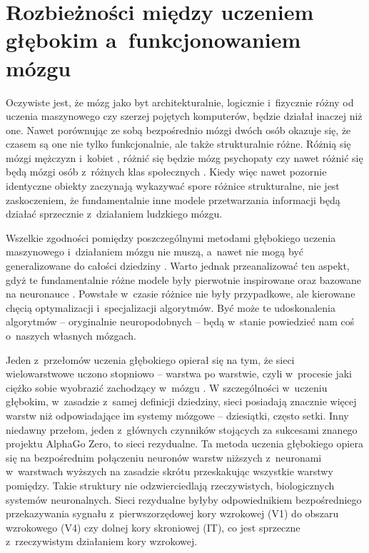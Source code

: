 \section{Rozbieżności między uczeniem głębokim a~funkcjonowaniem mózgu}
\label{sec:differences}

Oczywiste jest, że mózg jako byt architekturalnie, logicznie i~fizycznie różny od uczenia maszynowego czy szerzej pojętych komputerów, będzie działał inaczej niż one.
Nawet porównując ze sobą bezpośrednio mózgi dwóch osób okazuje się, że czasem są one nie tylko funkcjonalnie, ale także strukturalnie różne.
Różnią się mózgi mężczyzn i~kobiet \cite{ingalhalikar2014sex}, różnić się będzie mózg psychopaty \cite{fallon2017neuroanatomical} czy nawet różnić się będą mózgi osób z~różnych klas społecznych \cite{rushton1996brain}.
Kiedy więc nawet pozornie identyczne obiekty zaczynają wykazywać spore różnice strukturalne, nie jest zaskoczeniem, że fundamentalnie inne modele przetwarzania informacji będą działać sprzecznie z~działaniem ludzkiego mózgu.

Wszelkie zgodności pomiędzy poszczególnymi metodami głębokiego uczenia maszynowego i~działaniem mózgu nie muszą, a~nawet nie mogą być generalizowane do całości dziedziny \cite{de2018deep}.
Warto jednak przeanalizować ten aspekt, gdyż te fundamentalnie różne modele były pierwotnie inspirowane oraz bazowane na neuronauce \cite{hassabis2017neuroscience}.
Powstałe w~czasie różnice nie były przypadkowe, ale kierowane chęcią optymalizacji i~specjalizacji algorytmów.
Być może te udoskonalenia algorytmów -- oryginalnie neuropodobnych -- będą w~stanie powiedzieć nam coś o~naszych własnych mózgach.

Jeden z~przełomów uczenia głębokiego opierał się na tym, że sieci wielowarstwowe uczono stopniowo -- warstwa po warstwie, czyli w~procesie jaki ciężko sobie wyobrazić zachodzący w~mózgu \cite{hinton2006fast}.
W szczególności w~uczeniu głębokim, w~zasadzie z~samej definicji dziedziny, sieci posiadają znacznie więcej warstw niż odpowiadające im systemy mózgowe -- dziesiątki, często setki.
Inny niedawny przełom, jeden z~głównych czynników stojących za sukcesami znanego projektu AlphaGo Zero, to sieci rezydualne.
Ta metoda uczenia głębokiego opiera się na bezpośrednim połączeniu neuronów warstw niższych z~neuronami w~warstwach wyższych na zasadzie skrótu przeskakując wszystkie warstwy pomiędzy.
Takie struktury nie odzwierciedlają rzeczywistych, biologicznych systemów neuronalnych.
Sieci rezydualne byłyby odpowiednikiem bezpośredniego przekazywania sygnału z~pierwszorzędowej kory wzrokowej (V1) do obszaru wzrokowego (V4) czy dolnej kory skroniowej (IT), co jest sprzeczne z~rzeczywistym działaniem kory wzrokowej.

